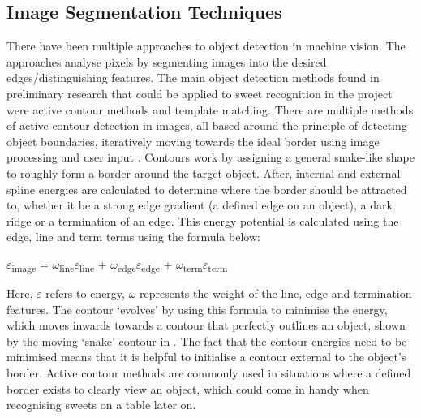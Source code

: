 \subsection{Image Segmentation Techniques}
There have been multiple approaches to object detection in machine vision. The approaches analyse pixels by segmenting images into the desired edges/distinguishing features. The main object detection methods found in preliminary research that could be applied to sweet recognition in the project were active contour methods and template matching.
\newline\newline
There are multiple methods of active contour detection in images, all based around the principle of detecting object boundaries, iteratively moving towards the ideal border using image processing and user input \cite{activecontours, mortensen}. Contours work by assigning a general snake-like shape to roughly form a border around the target object. After, internal and external spline energies are calculated to determine where the border should be attracted to, whether it be a strong edge gradient (a defined edge on an object), a dark ridge or a termination of an edge. This energy potential is calculated using the edge, line and term terms using the formula below:
\begin{center}
$\varepsilon$\textsubscript{image} = $\omega$\textsubscript{line}$\varepsilon$\textsubscript{line} + $\omega$\textsubscript{edge}$\varepsilon$\textsubscript{edge} +  $\omega$\textsubscript{term}$\varepsilon$\textsubscript{term}
\end{center}
Here, $\varepsilon$ refers to energy, $\omega$ represents the weight of the line, edge and termination features. The contour `evolves' by using this formula to minimise the energy, which moves inwards towards a contour that perfectly outlines an object, shown by the moving `snake' contour in \textbf{}. The fact that the contour energies need to be minimised means that it is helpful to initialise a contour external to the object's border. Active contour methods are commonly used in situations where a defined border exists to clearly view an object, which could come in handy when recognising sweets on a table later on.

